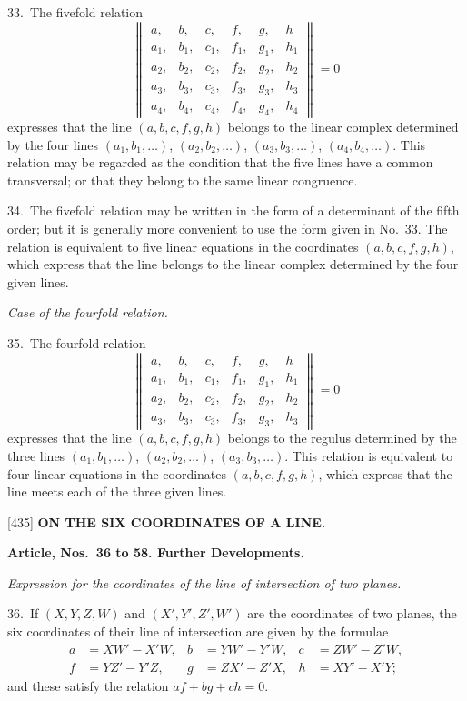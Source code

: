 \documentclass[12pt,a4paper]{article}
\newcommand{\paperref}[1]{\textup{[#1]}}
\theoremstyle{definition}
\begin{document}
33.~The fivefold relation
\[
\begin{Vmatrix}
a, & b, & c, & f, & g, & h \\
a_1, & b_1, & c_1, & f_1, & g_1, & h_1 \\
a_2, & b_2, & c_2, & f_2, & g_2, & h_2 \\
a_3, & b_3, & c_3, & f_3, & g_3, & h_3 \\
a_4, & b_4, & c_4, & f_4, & g_4, & h_4
\end{Vmatrix}
= 0
\]
expresses that the line $(a, b, c, f, g, h)$ belongs to the linear complex determined by the four lines $(a_1, b_1, \ldots)$, $(a_2, b_2, \ldots)$, $(a_3, b_3, \ldots)$, $(a_4, b_4, \ldots)$. This relation may be regarded as the condition that the five lines have a common transversal; or that they belong to the same linear congruence.

34.~The fivefold relation may be written in the form of a determinant of the fifth order; but it is generally more convenient to use the form given in No.~33. The relation is equivalent to five linear equations in the coordinates $(a, b, c, f, g, h)$, which express that the line belongs to the linear complex determined by the four given lines.

\textit{Case of the fourfold relation.}

35.~The fourfold relation
\[
\begin{Vmatrix}
a, & b, & c, & f, & g, & h \\
a_1, & b_1, & c_1, & f_1, & g_1, & h_1 \\
a_2, & b_2, & c_2, & f_2, & g_2, & h_2 \\
a_3, & b_3, & c_3, & f_3, & g_3, & h_3
\end{Vmatrix}
= 0
\]
expresses that the line $(a, b, c, f, g, h)$ belongs to the regulus determined by the three lines $(a_1, b_1, \ldots)$, $(a_2, b_2, \ldots)$, $(a_3, b_3, \ldots)$. This relation is equivalent to four linear equations in the coordinates $(a, b, c, f, g, h)$, which express that the line meets each of the three given lines.

\newpage
\setcounter{page}{80}

\noindent\paperref{435}\quad
\textbf{ON THE SIX COORDINATES OF A LINE.}

\smallskip
\textbf{Article, Nos.~36 to 58. Further Developments.}

\smallskip
\textit{Expression for the coordinates of the line of intersection of two planes.}

36.~If $(X, Y, Z, W)$ and $(X', Y', Z', W')$ are the coordinates of two planes, the six coordinates of their line of intersection are given by the formulae
\begin{align*}
a &= X W' - X' W, & b &= Y W' - Y' W, & c &= Z W' - Z' W,\\
f &= Y Z' - Y' Z, & g &= Z X' - Z' X, & h &= X Y' - X' Y;
\end{align*}
and these satisfy the relation $af + bg + ch = 0$.
\end{document}
